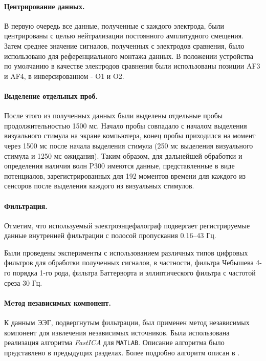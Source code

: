 \documentclass[12pt,a4paper,oneside,fleqn,leqno]{article}
\begin{document}
	\paragraph{Центрирование данных.}
	\par В первую очередь все данные, полученные с каждого электрода, были центрированы с целью нейтрализации постоянного амплитудного смещения. Затем среднее значение сигналов, полученных с электродов сравнения, было использовано для референциального монтажа данных. В положении устройства по умолчанию в качестве электродов сравнения были использованы позиции AF3 и AF4, в инверсированном - O1 и O2.
	\paragraph{Выделение отдельных проб.}
	\par После этого из полученных данных были выделены отдельные пробы продолжительностью 1500 мс. Начало пробы совпадало с началом выделения визуального стимула на экране компьютера, конец пробы приходился на момент через 1500 мс после начала выделения стимула (250 мс выделения визуального стимула и 1250 мс ожидания). Таким образом, для дальнейшей обработки и определения наличия волн P300 имеются данные, представленные в виде потенциалов, зарегистрированных для 192 моментов времени для каждого из сенсоров после выделения каждого из визуальных стимулов.
	\paragraph{Фильтрация.}
	\par Отметим, что используемый электроэнцефалограф подвергает регистрируемые данные внутренней фильтрации с полосой пропускания 0.16--43 Гц.
	\par Были проведены эксперименты с использованием различных типов цифровых фильтров для обработки полученных сигналов, в частности, фильтра Чебышева 4-го порядка 1-го рода, фильтра Баттерворта и эллиптического фильтра с частотой среза 30 Гц.
	\paragraph{Мeтод независимых компонент.}
	\par К данным ЭЭГ, подвергнутым фильтрации, был применен метод независимых компонент для извлечения независимых источников. Была использована реализация алгоритма {\it FastICA} для {\tt MATLAB}. Описание алгоритма было представлено в предыдущих разделах. Более подробно алгоритм описан в \cite{FastICA}.
\end{document}
